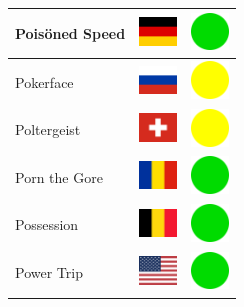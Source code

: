 \documentclass[12pt, a4paper, twoside]{report}
\begin{document}
\begin{center}
\begin{longtable}{|p{5cm}|p{2cm}|p{2cm}|}
Poisöned Speed & \includegraphics[width=1cm]{4x3/de} & \includegraphics[width=1cm]{likes/y} \\ \hline
Pokerface & \includegraphics[width=1cm]{4x3/ru} & \includegraphics[width=1cm]{likes/m} \\ \hline
Poltergeist & \includegraphics[width=1cm]{4x3/ch} & \includegraphics[width=1cm]{likes/m} \\ \hline
Porn the Gore & \includegraphics[width=1cm]{4x3/ro} & \includegraphics[width=1cm]{likes/y} \\ \hline
Possession & \includegraphics[width=1cm]{4x3/be} & \includegraphics[width=1cm]{likes/y} \\ \hline
Power Trip & \includegraphics[width=1cm]{4x3/us} & \includegraphics[width=1cm]{likes/y} \\ \hline

\end{longtable}
\end{center}
\end{document}
